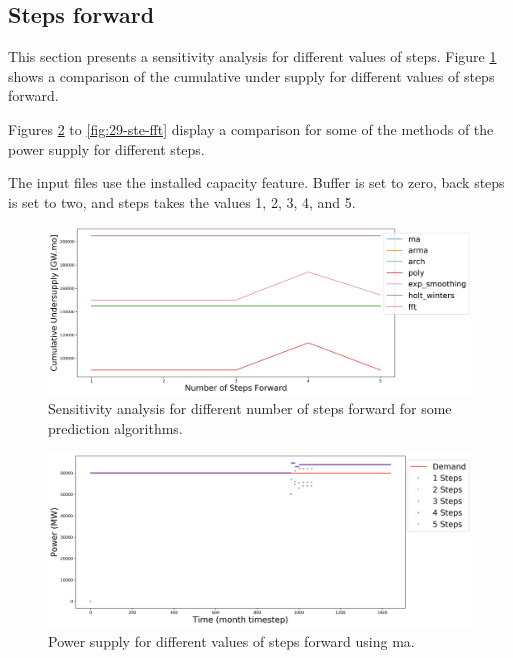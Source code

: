 \documentclass[11pt]{article}
\begin{document}
\subsection{Steps forward}

This section presents a sensitivity analysis for different values of steps.
Figure \ref{fig:29-steps} shows a comparison of the cumulative under supply for different values of steps forward.

Figures \ref{fig:29-ste-ma} to \ref{fig:29-ste-fft} display a comparison for some of the methods of the power supply for different steps.

The input files use the installed capacity feature. Buffer is set to zero, back steps is set to two, and steps takes the values 1, 2, 3, 4, and 5.

\begin{figure}[!h]
	\centering
	\includegraphics[width=\textwidth]{29-figures/29-sens-steps.png} 
	\hfill
	\caption{Sensitivity analysis for different number of steps forward for some prediction algorithms.}
	\label{fig:29-steps}
\end{figure}

\begin{figure}[!h]
	\centering
	\includegraphics[width=\textwidth]{29-figures/29-power-buffer0-ma-steps.png} 
	\hfill
	\caption{Power supply for different values of steps forward using ma.}
	\label{fig:29-ste-ma}
\end{figure}
\end{document}
